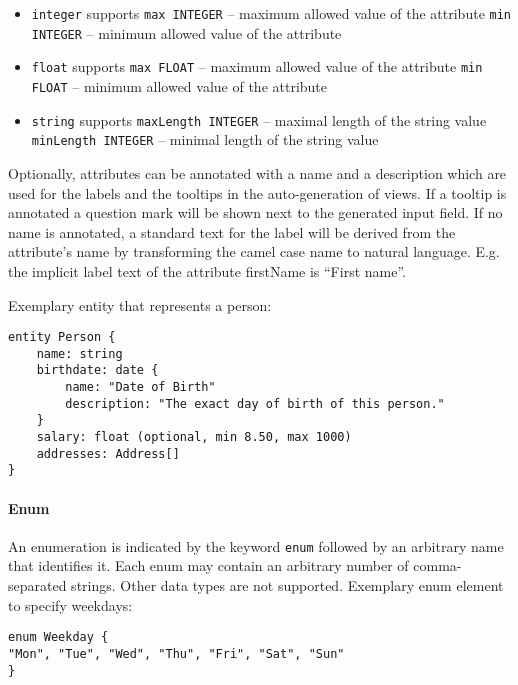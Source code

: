 \begin{itemize}
\item \lstinline!integer! supports
\subitem \lstinline!max INTEGER! – maximum allowed value of the attribute
\subitem \lstinline!min INTEGER! – minimum allowed value of the attribute
\item \lstinline!float! supports
\subitem \lstinline!max FLOAT! – maximum allowed value of the attribute
\subitem \lstinline!min FLOAT! – minimum allowed value of the attribute
\item \lstinline!string! supports
\subitem \lstinline!maxLength INTEGER! – maximal length of the string value
\subitem \lstinline!minLength INTEGER! – minimal length of the string value
\end{itemize}

Optionally, attributes can be annotated with a name and a description which are used for the labels and the tooltips in the auto-generation of views. If a tooltip is annotated a question mark will be shown next to the generated input field. If no name is annotated, a standard text for the label will be derived from the attribute's name by transforming the camel case name to natural language. E.g. the implicit label text of the attribute firstName is \enquote{First name}.

Exemplary entity that represents a person:
\begin{lstlisting}
entity Person {
	name: string
	birthdate: date {
		name: "Date of Birth"
		description: "The exact day of birth of this person."
	}
	salary: float (optional, min 8.50, max 1000)
	addresses: Address[]
}
\end{lstlisting}

\paragraph{Enum}
An enumeration is indicated by the keyword \lstinline!enum! followed by an arbitrary name that identifies it. Each enum may contain an arbitrary number of comma-separated strings. Other data types are not supported.
Exemplary enum element to specify weekdays:
\begin{lstlisting}
enum Weekday {
"Mon", "Tue", "Wed", "Thu", "Fri", "Sat", "Sun"
}
\end{lstlisting}